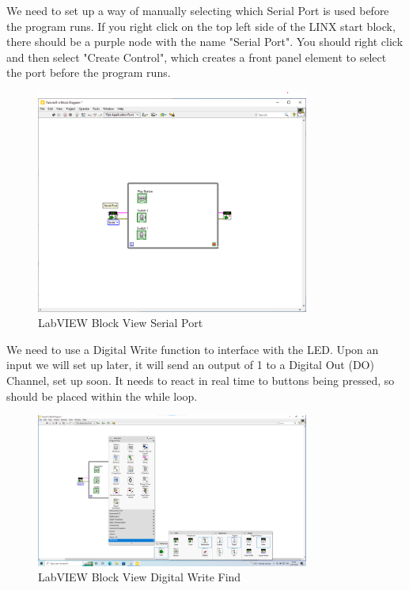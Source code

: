 \documentclass[a4paper,11pt]{report}
\begin{document}
We need to set up a way of manually selecting which Serial Port is used before the program runs. If you right click on the top left side of the LINX start block, there should be a purple node with the name "Serial Port". You should right click and then select "Create Control", which creates a front panel element to select the port before the program runs.

\begin{figure}[H]
\centering
\includegraphics[width=0.8\textwidth]{screenshots/labview18}
\caption{LabVIEW Block View Serial Port}
\end{figure}

We need to use a Digital Write function to interface with the LED. Upon an input we will set up later, it will send an output of 1 to a Digital Out (DO) Channel, set up soon. It needs to react in real time to buttons being pressed, so should be placed within the while loop.

\begin{figure}[H]
\centering
\includegraphics[width=0.8\textwidth]{screenshots/labview17}
\caption{LabVIEW Block View Digital Write Find}
\end{figure}
\end{document}
